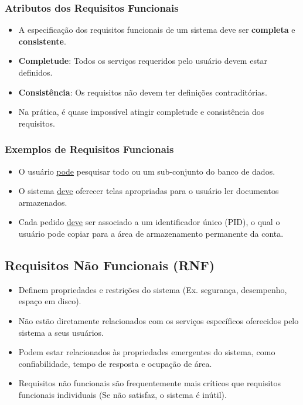 \documentclass[a4paper, 11pt]{article}
\begin{document}
\subsubsection{Atributos dos Requisitos Funcionais}
\begin{itemize}
	\item A especificação dos requisitos funcionais de um sistema deve ser \textbf{completa} e \textbf{consistente}.
	\item \textbf{Completude}: Todos os serviços requeridos pelo usuário devem estar definidos.
	\item \textbf{Consistência}: Os requisitos não devem ter definições contraditórias.
	\item Na prática, é quase impossível atingir completude e consistência dos requisitos.
\end{itemize}

\subsubsection{Exemplos de Requisitos Funcionais}
\begin{itemize}
	\item O usuário \underline{pode} pesquisar todo ou um sub-conjunto do banco de dados.
	\item O sistema \underline{deve} oferecer telas apropriadas para o usuário ler documentos armazenados.
	\item Cada pedido \underline{deve} ser associado a um identificador único (PID), o qual o usuário pode copiar para a área de armazenamento permanente da conta.
\end{itemize}

\subsection{Requisitos Não Funcionais (RNF)}
\begin{itemize}
	\item Definem propriedades e restrições do sistema (Ex. segurança, desempenho, espaço em disco).
	\item Não estão diretamente relacionados com os serviços específicos oferecidos pelo sistema a seus usuários.
	\item Podem estar relacionados às propriedades emergentes do sistema, como confiabilidade, tempo de resposta e ocupação de área.
	\item Requisitos não funcionais são frequentemente mais críticos que requisitos funcionais individuais (Se não satisfaz, o sistema é inútil).
\end{itemize}
\end{document}

